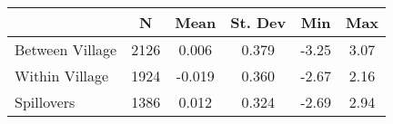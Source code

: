 \begin{tabular}{l*{5}{c}}\hline&\multicolumn{1}{c}{N}&\multicolumn{1}{c}{Mean}&\multicolumn{1}{c}{St. Dev}&\multicolumn{1}{c}{Min}&\multicolumn{1}{c}{Max}\\ \hline 
Between Village & 2126 & 0.006 & 0.379 & -3.25 & 3.07 \\
Within Village & 1924 & -0.019 & 0.360 & -2.67 & 2.16 \\
Spillovers & 1386 & 0.012 & 0.324 & -2.69 & 2.94 \\
\hline \end{tabular}
